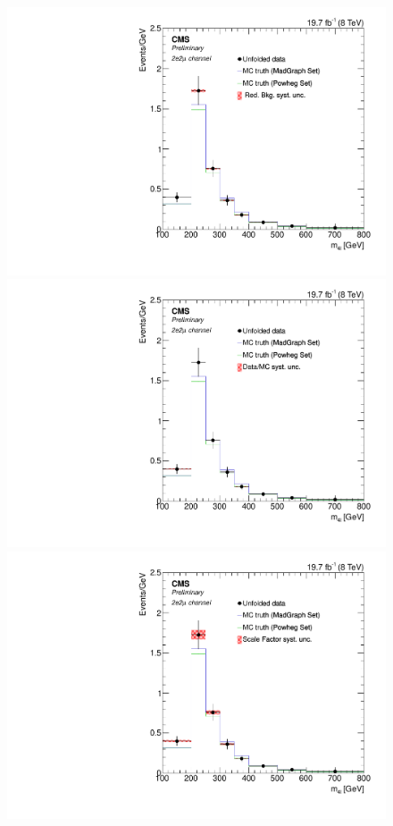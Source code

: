 \begin{figure}[hbtp]
\begin{center}
    \includegraphics[width=0.8\cmsFigWidth]{Figures/Unfolding/Systematics/ZZTo2e2m_Mass_RedBkg_Pow_fr}     
    \includegraphics[width=0.8\cmsFigWidth]{Figures/Unfolding/Systematics/ZZTo2e2m_Mass_UnfDataOverGenMC_Pow_fr}  
     \includegraphics[width=0.8\cmsFigWidth]{Figures/Unfolding/Systematics/ZZTo2e2m_Mass_SFSq_Pow_fr}     

\end{center}
\end{figure}
